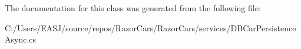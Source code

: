 The documentation for this class was generated from the following file\+:\begin{DoxyCompactItemize}
\item 
C\+:/\+Users/\+E\+A\+S\+J/source/repos/\+Razor\+Cars/\+Razor\+Cars/services/D\+B\+Car\+Persistence\+Async.\+cs\end{DoxyCompactItemize}
